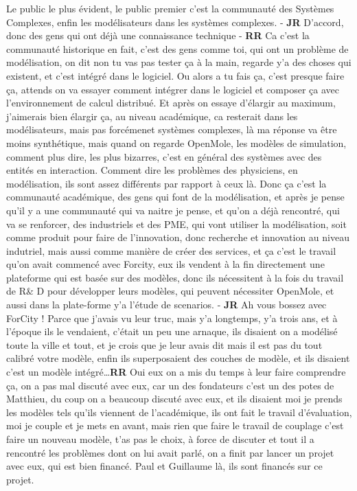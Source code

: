 \documentclass[12pt]{article}
\begin{document}
Le public le plus évident, le public premier c'est la communauté des Systèmes Complexes, enfin les modélisateurs dans les systèmes complexes. - \textbf{JR} D'accord, donc des gens qui ont déjà une connaissance technique - \textbf{RR} Ca c'est la communauté historique en fait, c'est des gens comme toi, qui ont un problème de modélisation, on dit non tu vas pas tester ça à la main, regarde y'a des choses qui existent, et c'est intégré dans le logiciel. Ou alors a tu fais ça, c'est presque faire ça, attends on va essayer comment intégrer dans le logiciel et composer ça avec l'environnement de calcul distribué. Et après on essaye d'élargir au maximum, j'aimerais bien élargir ça, au niveau académique, ca resterait dans les modélisateurs, mais pas forcémenet systèmes complexes, là ma réponse va être moins synthétique, mais quand on regarde OpenMole, les modèles de simulation, comment plus dire, les plus bizarres, c'est en général des systèmes avec des entités en interaction. Comment dire les problèmes des physiciens, en modélisation, ils sont assez différents par rapport à ceux là. Donc ça c'est la communauté académique, des gens qui font de la modélisation, et après je pense qu'il y a une communauté qui va naitre je pense, et qu'on a déjà rencontré, qui va se renforcer, des industriels et des PME, qui vont utiliser la modélisation, soit comme produit pour faire de l'innovation, donc recherche et innovation au niveau indutriel, mais aussi comme manière de créer des services, et ça c'est le travail qu'on avait commencé avec Forcity, eux ils vendent à la fin directement une plateforme qui est basée sur des modèles, donc ils nécessitent à la fois du travail de R\& D pour développer leurs modèles, qui peuvent nécessiter OpenMole, et aussi dans la plate-forme y'a l'étude de scenarios. - \textbf{JR} Ah vous bossez avec ForCity ! Parce que j'avais vu leur truc, mais y'a longtemps, y'a trois ans, et à l'époque ils le vendaient, c'était un peu une arnaque, ils disaient on a modélisé toute la ville et tout, et je crois que je leur avais dit mais il est pas du tout calibré votre modèle, enfin ils superposaient des couches de modèle, et ils disaient c'est un modèle intégré\ldots \textbf{RR} Oui eux on a mis du temps à leur faire comprendre ça, on a pas mal discuté avec eux, car un des fondateurs c'est un des potes de Matthieu, du coup on a beaucoup discuté avec eux, et ils disaient moi je prends les modèles tels qu'ils viennent de l'académique, ils ont fait le travail d'évaluation, moi je couple et je mets en avant, mais rien que faire le travail de couplage c'est faire un nouveau modèle, t'as pas le choix, à force de discuter et tout il a rencontré les problèmes dont on lui avait parlé, on a finit par lancer un projet avec eux, qui est bien financé. Paul et Guillaume là, ils sont financés sur ce projet.
\end{document}
